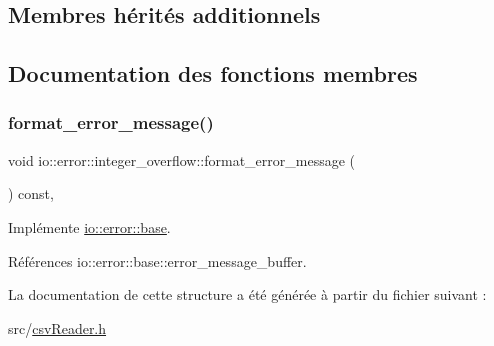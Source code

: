 \subsection*{Membres hérités additionnels}


\subsection{Documentation des fonctions membres}
\mbox{\label{structio_1_1error_1_1integer__overflow_a25825600c3c29210160ba201519e6312}} 
\subsubsection{\texorpdfstring{format\+\_\+error\+\_\+message()}{format\_error\_message()}}
{\footnotesize\ttfamily void io\+::error\+::integer\+\_\+overflow\+::format\+\_\+error\+\_\+message (\begin{DoxyParamCaption}{ }\end{DoxyParamCaption}) const\hspace{0.3cm}{\ttfamily [inline]}, {\ttfamily [virtual]}}



Implémente \hyperlink{structio_1_1error_1_1base_a7d9ff6a31b716a24f056cf8a3e15191d}{io\+::error\+::base}.



Références io\+::error\+::base\+::error\+\_\+message\+\_\+buffer.



La documentation de cette structure a été générée à partir du fichier suivant \+:\begin{DoxyCompactItemize}
\item 
src/\hyperlink{csvReader_8h}{csv\+Reader.\+h}\end{DoxyCompactItemize}
